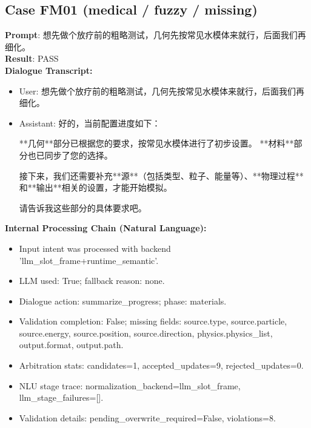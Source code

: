 \documentclass[11pt]{ctexart}
\begin{document}
\subsection{Case FM01 (medical / fuzzy / missing)}
\textbf{Prompt}: 想先做个放疗前的粗略测试，几何先按常见水模体来就行，后面我们再细化。\\
\textbf{Result}: PASS\\
\textbf{Dialogue Transcript:}
\begin{itemize}
\item User: 想先做个放疗前的粗略测试，几何先按常见水模体来就行，后面我们再细化。
\item Assistant: 好的，当前配置进度如下：

**几何**部分已根据您的要求，按常见水模体进行了初步设置。
**材料**部分也已同步了您的选择。

接下来，我们还需要补充**源**（包括类型、粒子、能量等）、**物理过程**和**输出**相关的设置，才能开始模拟。

请告诉我这些部分的具体要求吧。
\end{itemize}
\textbf{Internal Processing Chain (Natural Language):}
\begin{itemize}
\item Input intent was processed with backend 'llm\_slot\_frame+runtime\_semantic'.
\item LLM used: True; fallback reason: none.
\item Dialogue action: summarize\_progress; phase: materials.
\item Validation completion: False; missing fields: source.type, source.particle, source.energy, source.position, source.direction, physics.physics\_list, output.format, output.path.
\item Arbitration stats: candidates=1, accepted\_updates=9, rejected\_updates=0.
\item NLU stage trace: normalization\_backend=llm\_slot\_frame, llm\_stage\_failures=[].
\item Validation details: pending\_overwrite\_required=False, violations=8.
\end{itemize}
\end{document}
